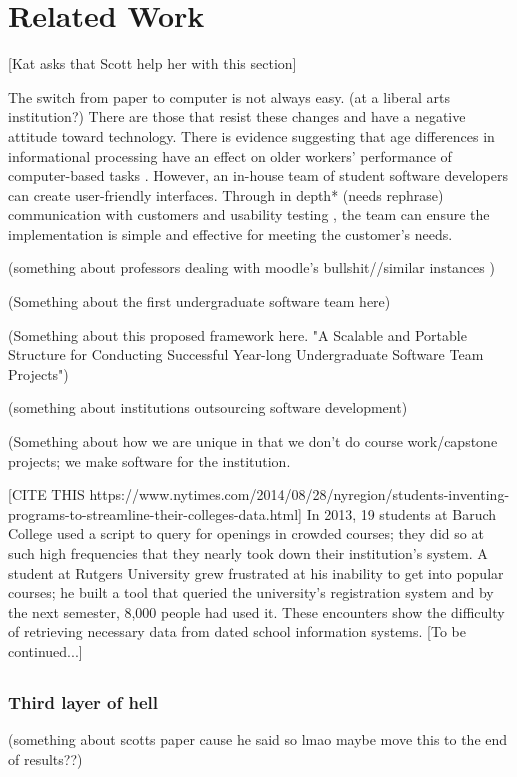 \section{Related Work}
[Kat asks that Scott help her with this section]

The switch from paper to computer is not always easy. (at a liberal arts institution?) There are those that resist these changes and have a negative attitude toward technology. There is evidence suggesting that age differences in informational processing have an effect on older workers' performance of computer-based tasks \cite{oldpeopleandtech}.
However, an in-house team of student software developers can create user-friendly interfaces. Through in depth* (needs rephrase) communication with customers and usability testing \cite{usabilitytesting}, the team can ensure the implementation is simple and effective for meeting the customer's needs.

(something about professors dealing with moodle's bullshit//similar instances )

(Something about the first undergraduate software team here)\cite{rochesterfirstundergradsoftwareteam}

(Something about this proposed framework here. "A Scalable and Portable Structure for Conducting Successful Year-long Undergraduate Software Team Projects") \cite{yearlong}

(something about institutions outsourcing software development)

(Something about how we are unique in that we don't do course work/capstone projects; we make software for the institution.

[CITE THIS https://www.nytimes.com/2014/08/28/nyregion/students-inventing-programs-to-streamline-their-colleges-data.html] 
In 2013, 19 students at Baruch College used a script to query for openings in crowded courses; they did so at such high frequencies that they nearly took down their institution's system. A student at Rutgers University grew frustrated at his inability to get into popular courses; he built a tool that queried the university's registration system and by the next semester, 8,000 people had used it. These encounters show the difficulty of retrieving necessary data from dated school information systems. 
[To be continued...]
\subsection{}

\subsubsection{Third layer of hell}

(something about scotts paper cause he said so lmao maybe move this to the end of results??) \cite{heggen2018hiring}